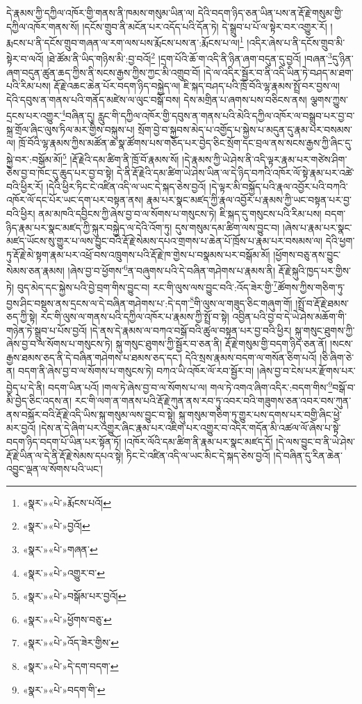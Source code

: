 དེ་རྣམས་ཀྱི་དཀྱིལ་འཁོར་གྱི་གནས་ནི་ཁམས་གསུམ་ཡིན་ལ། དེའི་བདག་ཉིད་ཅན་ཡིན་པས་ན་རྡོ་རྗེ་གསུམ་གྱི་དཀྱིལ་འཁོར་གནས་སོ། །དངོས་གྲུབ་ནི་མངོན་པར་འདོད་པའི་དོན་ཏེ། དེ་སྒྲུབ་པ་པོ་ལ་སྟེར་བར་འགྱུར་རོ། །
རྨངས་པ་ནི་དངོས་གྲུབ་གཞན་ལ་རག་ལས་པས་རྨོངས་པས་ན་:རྨོངས་པ་ལ།\footnote{«སྣར་»«པེ་»རྨོངས་པའོ།} །འདིར་ཞེས་པ་ནི་དངོས་གྲུབ་མི་སྟེར་བ་ལའོ། །ཐེ་ཚོམ་ནི་ཡིད་གཉིས་མི་:བྱ་བའོ།\footnote{«སྣར་»«པེ་»བྱའོ།} །དྲག་པོའི་ཆོ་ག་འདི་ནི་ཉིན་ཞག་བདུན་དུ་བྱའོ། །བཞན་\footnote{«སྣར་»«པེ་»གཞན་}དུ་ཉིན་ཞག་བདུན་ཚུན་ཆད་ཀྱིས་ནི་སངས་རྒྱས་ཀྱིས་ཀྱང་མི་འགྲུབ་བོ། །དེ་ལ་འདིར་སྦྱོར་བ་ནི་འདི་ཡིན་ཏེ་བཤད་མ་ཐག་པའི་རིམ་པས། རྡོ་རྗེ་འཆང་ཆེན་པོར་བདག་ཉིད་བསྐྱེད་ལ། ཇི་སྐད་བཤད་པའི་ཁྲོ་བོའི་ལྷ་རྣམས་སྤྲོ་བར་བྱས་ལ། དེའི་དབུས་ན་གནས་པའི་གནོད་མཛེས་ལ་ལུང་བསྒོ་བས། དེས་མགྲིན་པ་ཞགས་པས་བཅིངས་ནས། ལྕགས་ཀྱུས་དྲངས་པར་འགྱུར་\footnote{«སྣར་»«པེ་»འགྱུར་བ་}བཞིན་དུ། རླུང་གི་དཀྱིལ་འཁོར་གྱི་དབུས་ན་གནས་པའི་མེའི་དཀྱིལ་འཁོར་ལ་བསྒྲུབ་པར་བྱ་བ་སྐྲ་གྲོལ་ཞིང་ལུས་ཏིལ་མར་གྱིས་བསྐུས་པ། སྲོག་བྱེ་བ་སྐྱབས་མེད་པ་འགྱོད་པ་སྐྱེས་པ་མདུན་དུ་རྣམ་པར་བསམས་ལ། ཁྲོ་བོའི་ལྷ་རྣམས་ཀྱིས་མཚོན་ཆ་སྣ་ཚོགས་པས་གཅོད་པར་བྱེད་ཅིང་སྲོག་དང་བྲལ་ནས་སངས་རྒྱས་ཀྱི་ཞིང་དུ་སྐྱེ་བར་:བསྒོམ་མོ།\footnote{«སྣར་»«པེ་»བསྒོམ་པར་བྱའོ།} །རྡོ་རྗེའི་དམ་ཚིག་ནི་ཁྲོ་བོ་རྣམས་སོ། །དེ་རྣམས་ཀྱི་ཡེ་ཤེས་ནི་འདི་ལྟར་རྣམ་པར་གཙེས་ཤིག་ཅེས་བྱ་བ་ཁོང་དུ་ཆུད་པར་བྱ་བ་སྟེ། དེ་ནི་རྡོ་རྗེའི་དམ་ཚིག་ཡེ་ཤེས་ཡིན་ལ་དེ་ཉིད་བཀའི་འཁོར་ལོ་སྟེ་རྣམ་པར་འཚེ་བའི་ཕྱིར་རོ། །དེའི་ཕྱིར་ཏིང་ངེ་འཛིན་འདི་ལ་ཡང་དེ་སྐད་ཅེས་བྱའོ། །དེ་ལྟར་མི་བསྐྱོད་པའི་རྣལ་འབྱོར་པའི་བཀའི་འཁོར་ལོ་དང་པོར་ཡང་དག་པར་བསྟན་ནས། རྣམ་པར་སྣང་མཛད་ཀྱི་རྣལ་འབྱོར་པ་རྣམས་ཀྱི་ཡང་བསྟན་པར་བྱ་བའི་ཕྱིར། ནམ་མཁའི་དབྱིངས་ཀྱི་ཞེས་བྱ་བ་ལ་སོགས་པ་གསུངས་ཏེ། ཇི་སྐད་དུ་གསུངས་པའི་རིམ་པས། བདག་ཉིད་རྣམ་པར་སྣང་མཛད་ཀྱི་སྐུར་བསྐྱེད་ལ་དེའི་འོག་ཏུ། དུས་གསུམ་དམ་ཚིག་ལས་བྱུང་བ། །ཞེས་པ་རྣམ་པར་སྣང་མཛད་ཡོངས་སུ་གྱུར་པ་ལས་བྱུང་བའི་རྡོ་རྗེ་སེམས་དཔའ་གྲགས་པ་ཆེན་པོ་ཁྲོས་པ་རྣམ་པར་བསམས་ལ། དེའི་ཕྱག་ཏུ་རྡོ་རྗེ་མེ་སྟག་རྣམ་པར་འཕྲོ་བས་འཁྲུགས་པའི་རྡོ་རྗེ་ཁ་གྱེས་པ་བསྣམས་པར་བསྒོམ་མོ། །ཕྱོགས་བཅུ་ནས་བྱུང་སེམས་ཅན་རྣམས། །ཞེས་བྱ་བ་ཕྱོགས་\footnote{«སྣར་»«པེ་»ཕྱོགས་བཅུ་}ན་བཞུགས་པའི་དེ་བཞིན་གཤེགས་པ་རྣམས་ནི། རྡོ་རྗེ་སྐུའི་ཁྱད་པར་གྱིས་ཏེ། བུད་མེད་དང་སྐྱེས་པའི་བྱེ་བྲག་གིས་བྱུང་བ། རང་གི་ལུས་ལས་བྱུང་བའི་:འོད་ཟེར་གྱི་\footnote{«སྣར་»«པེ་»འོད་ཟེར་གྱིས་}ཚོགས་ཀྱིས་གཅིག་ཏུ་བྱས་ཤིང་བསྡུས་ནས་དྲངས་ལ་དེ་བཞིན་གཤེགས་པ་:དེ་དག་\footnote{«སྣར་»«པེ་»དེ་དག་བདག་}གི་ལུས་ལ་གཟུད་ཅིང་གཞུག་གོ། །སྤྲོ་བ་རྡོ་རྗེ་ཐམས་ཅད་ཀྱི་སྟེ། རང་གི་ལུས་ལ་གནས་པའི་དཀྱིལ་འཁོར་པ་རྣམས་ཀྱི་སྤྲོ་བ་སྟེ། འབྱིན་པའི་བྱ་བ་དེ་ཡེ་ཤེས་མཆོག་གི་གཉེན་ཏེ་སྒྲུབ་པ་པོས་བྱའོ། །དེ་ནས་དེ་རྣམས་ལ་བཀའ་བསྒོ་བའི་ཚུལ་བསྟན་པར་བྱ་བའི་ཕྱིར། སྐུ་གསུང་ཐུགས་ཀྱི་ཞེས་བྱ་བ་ལ་སོགས་པ་གསུངས་ཏེ། སྐུ་གསུང་ཐུགས་ཀྱི་སྦྱོར་བ་ཅན་ནི། རྡོ་རྗེ་གསུམ་གྱི་བདག་ཉིད་ཅན་ནོ། །སངས་རྒྱས་ཐམས་ཅད་ནི་དེ་བཞིན་གཤེགས་པ་ཐམས་ཅད་དང་། དེའི་སྲས་རྣམས་བདག་ལ་གསོན་ཅིག་པའོ། །ཅི་ཞིག་ཅེ་ན། བདག་ནི་ཞེས་བྱ་བ་ལ་སོགས་པ་གསུངས་ཏེ། བཀའ་ཡི་འཁོར་ལོ་རབ་སྦྱོར་བ། །ཞེས་བྱ་བ་ངེས་པར་རྫོགས་པར་བྱེད་པ་དེ་ནི། བདག་ཡིན་པའོ། །གལ་ཏེ་ཞེས་བྱ་བ་ལ་སོགས་པ་ལ། གལ་ཏེ་འགའ་ཞིག་འདིར་:བདག་གིས་\footnote{«སྣར་»«པེ་»བདག་གི་}བསྒོ་བ་མི་བྱེད་ཅིང་འདས་ན། རང་གི་ལག་ན་གནས་པའི་རྡོ་རྗེ་ཀུན་ནས་རབ་ཏུ་འབར་བའི་གཟུགས་ཅན་འབར་བས་ཀུན་ནས་བསྐོར་བའི་རྡོ་རྗེ་འདི་ཡིས་སྐུ་གསུམ་ལས་བྱུང་བ་སྟེ། སྐུ་གསུམ་གཅིག་ཏུ་གྱུར་པས་དགས་པར་བགྱི་ཞིང་ཕྱེ་མར་བྱའོ། །དེས་ན་དེ་ཞིག་པར་འགྱུར་ཞིང་རྣམ་པར་འཇིག་པར་འགྱུར་བ་འདིར་གདོན་མི་འཚལ་ལོ་ཞེས་པ་སྟེ་བདག་ཉིད་བདག་པོ་ཡིན་པར་སྟོན་ཏོ། །འཁོར་ལོའི་དམ་ཚིག་ནི་རྣམ་པར་སྣང་མཛད་དོ། །དེ་ལས་བྱུང་བ་ནི་ཡེ་ཤེས་རྡོ་རྗེ་ཡིན་ལ་དེ་ནི་རྡོ་རྗེ་སེམས་དཔའ་སྟེ། ཏིང་ངེ་འཛིན་འདི་ལ་ཡང་མིང་དེ་སྐད་ཅེས་བྱའོ། །དེ་བཞིན་དུ་རིན་ཆེན་འབྱུང་ལྡན་ལ་སོགས་པའི་ཡང་། 